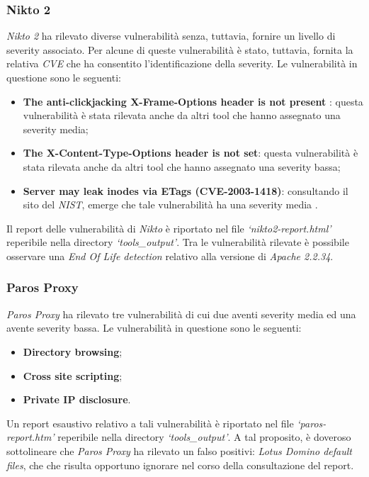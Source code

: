 \documentclass[a4paper,11pt,oneside,top=3cm,bottom=3cm,left=3.5cm,right=3.5cm,openright,reqno,table]{book}
\begin{document}
\subsubsection{Nikto 2}
\emph{Nikto 2} ha rilevato diverse vulnerabilità senza, tuttavia, fornire un livello di severity associato. Per alcune di queste vulnerabilità è stato, tuttavia, fornita la relativa \emph{CVE} che ha consentito l'identificazione della severity. Le vulnerabilità in questione sono le seguenti:
\begin{itemize}
    \item \textbf{The anti-clickjacking X-Frame-Options header is not present }: questa vulnerabilità è stata rilevata anche da altri tool che hanno assegnato una severity media;
    \item \textbf{The X-Content-Type-Options header is not set}: questa vulnerabilità è stata rilevata anche da altri tool che hanno assegnato una severity bassa;
    \item \textbf{Server may leak inodes via ETags (CVE-2003-1418)}: consultando il sito del \emph{NIST}, emerge che tale vulnerabilità ha una severity media \cite{inode}.
\end{itemize}
Il report delle vulnerabilità di \emph{Nikto} è riportato nel file \emph{`nikto2-report.html'} reperibile nella directory \emph{`tools\_output'}. Tra le vulnerabilità rilevate è possibile osservare una \emph{End Of Life detection} relativo alla versione di \emph{Apache 2.2.34}. 

\subsubsection{Paros Proxy}
\emph{Paros Proxy} ha rilevato tre vulnerabilità di cui due aventi severity media ed una avente severity bassa. Le vulnerabilità in questione sono le seguenti:
\begin{itemize}
    \item \textbf{Directory browsing};
    \item \textbf{Cross site scripting};
    \item \textbf{Private IP disclosure}.
\end{itemize}
Un report esaustivo relativo a tali vulnerabilità è riportato nel file \emph{`paros-report.htm'} reperibile nella directory \emph{`tools\_output'}. A tal proposito, è doveroso sottolineare che \emph{Paros Proxy} ha rilevato un falso positivi: \emph{Lotus Domino default files}, che che risulta opportuno ignorare nel corso della consultazione del report.
\end{document}
